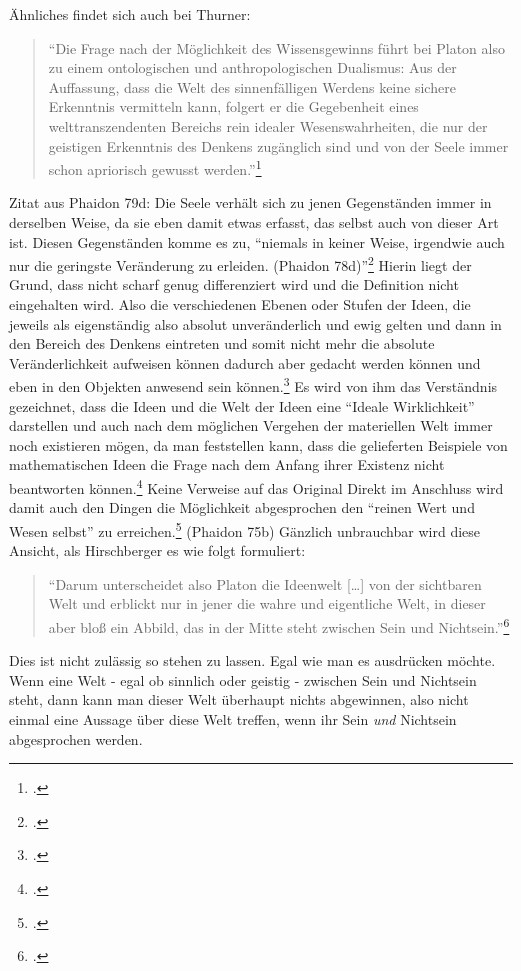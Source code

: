 \documentclass[12pt]{article}
\newcommand*{\zitatblock}[1]{%
    \begin{quote}
    \fontsize{10}{12}\selectfont
    \setlength{\parskip}{1.0em}
    #1
    \end{quote}
}
\begin{document}
Ähnliches findet sich auch bei Thurner:\zitatblock{\enquote{Die Frage nach der Möglichkeit des Wissensgewinns führt bei Platon also zu einem ontologischen und anthropologischen Dualismus: Aus der Auffassung, dass die Welt des sinnenfälligen Werdens keine sichere Erkenntnis vermitteln kann, folgert er die Gegebenheit eines welttranszendenten Bereichs rein idealer Wesenswahrheiten, die nur der geistigen Erkenntnis des Denkens zugänglich sind und von der Seele immer schon apriorisch gewusst werden.}\footcite[][S. 99]{ThurnerDualismus}}
Zitat aus Phaidon 79d: Die Seele verhält sich zu jenen Gegenständen immer in derselben Weise, da sie eben damit etwas erfasst, das selbst auch von dieser Art ist. Diesen Gegenständen komme es zu, \enquote{niemals in keiner Weise, irgendwie auch nur die geringste Veränderung zu erleiden. (Phaidon 78d)}\footcite[][S. 97]{Hirschberger}
Hierin liegt der Grund, dass nicht scharf genug differenziert wird und die Definition nicht eingehalten wird. Also die verschiedenen Ebenen oder Stufen der Ideen, die jeweils als eigenständig also absolut unveränderlich und ewig gelten und dann in den Bereich des Denkens eintreten und somit nicht mehr die absolute Veränderlichkeit aufweisen können dadurch aber gedacht werden können und eben in den Objekten anwesend sein können.\footcite[vgl.][S. 180f.]{Kutschera}
Es wird von ihm das Verständnis gezeichnet, dass die Ideen und die Welt der Ideen eine \enquote{Ideale Wirklichkeit} darstellen und auch nach dem möglichen Vergehen der materiellen Welt immer noch existieren mögen, da man feststellen kann, dass die gelieferten Beispiele von mathematischen Ideen die Frage nach dem Anfang ihrer Existenz nicht beantworten können.\footcite[vgl.][S. 99]{Hirschberger} Keine Verweise auf das Original
Direkt im Anschluss wird damit auch den Dingen die Möglichkeit abgesprochen den \enquote{reinen Wert und Wesen selbst} zu erreichen.\footcite[vgl.][S. 100]{Hirschberger} (Phaidon 75b)
Gänzlich unbrauchbar wird diese Ansicht, als Hirschberger es wie folgt formuliert:
\zitatblock{\enquote{Darum unterscheidet also Platon die Ideenwelt [\dots] von der sichtbaren Welt und erblickt nur in jener die wahre und eigentliche Welt, in dieser aber bloß ein Abbild, das in der Mitte steht zwischen Sein und Nichtsein.}\footcite[vgl.][S. 100]{Hirschberger}}
Dies ist nicht zulässig so stehen zu lassen. Egal wie man es ausdrücken möchte. Wenn eine Welt - egal ob sinnlich oder geistig - zwischen Sein und Nichtsein steht, dann kann man dieser Welt überhaupt nichts abgewinnen, also nicht einmal eine Aussage über diese Welt treffen, wenn ihr Sein \emph{und} Nichtsein abgesprochen werden. 
\end{document}
